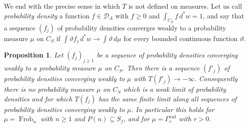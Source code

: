 \documentclass[11pt]{amsart}
\newtheorem{proposition}[theorem]{Proposition}
\theoremstyle{definition}
\newcommand{\Frob}{\operatorname{Frob}}
\newcommand{\DA}{\mathcal D_A}
\begin{document}
We end with the precise sense in which $T$ is not defined on measures. Let
us call \emph{probability density} a function $f\in\DA$ with $f\ge0$ and
$\int_{C_S}f\,d^*w=1$, and say that a sequence $(f_j)$ of probability
densities converges weakly to a probability measure $\mu$ on $C_S$ if
$\int\vartheta f_j\,d^*w\to\int\vartheta\,d\mu$ for every bounded continuous
function $\vartheta$.

\begin{proposition}\label{prop:noextension}
Let $(f_j)_{j\ge1}$ be a sequence of probability densities converging weakly
to a probability measure $\mu$ on $C_S$. Then there is a sequence $(f'_j)$ of
probability densities converging weakly to $\mu$ with $T(f'_j)\to-\infty$.
Consequently there is no probability measure $\mu$ on $C_S$ which is a weak
limit of probability densities and for which $T(f_j)$ has the same finite
limit along all sequences of probability densities converging weakly to
$\mu$. In particular this holds for $\mu=\Frob_n$ with $n\ge1$ and
$P(n)\subseteq S_f$, and for $\mu=\Gamma_r^{\mathrm{rad}}$ with $r>0$.
\end{proposition}
\end{document}
